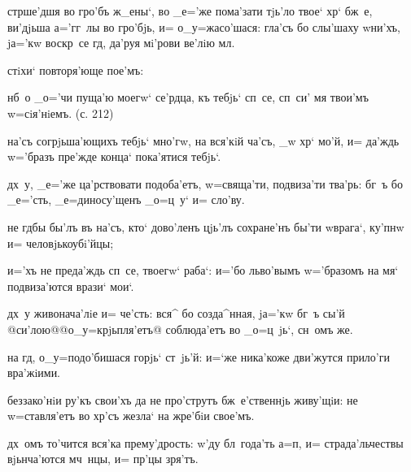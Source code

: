 
 стр ше'дшя во гро'бъ ж_ены`, во _е='же 
пома'зати тjь'ло твое` хр` бж~е, ви'дjьша а='гг~лы во 
гро'бjь, и= о_у=жасо'шася: гла'съ бо слы'шаху w\т ни'хъ, 
jа='кw воскр~се гд, да'руя мi'рови ве'лiю мл.


   стiхи` повторя'юще 
пое'мъ:

 нб~о _о='чи пуща'ю моегw` се'рдца, къ тебjь` 
сп~се, сп~си' мя твои'мъ w=сiя'нiемъ. (с. 212)

 на'съ согрjьша'ющихъ тебjь` мно'гw, на 
вся'кiй ча'съ, _w хр` мо'й, и= да'ждь w='бразъ 
пре'жде конца` пока'ятися тебjь`.

  дх~у, _е='же ца'рствовати 
подоба'етъ, w=свяща'ти, подвиза'ти тва'рь: бг~ъ бо 
_е='сть, _е=диносу'щенъ _о=ц~у` и= сло'ву.



 не гд бы бы'лъ въ на'съ, кто` дово'ленъ 
цjь'лъ сохране'нъ бы'ти w\т врага`, ку'пнw и= 
человjькоубi'йцы;

 и='хъ не преда'ждь сп~се, твоегw` раба`: 
и='бо льво'вымъ w='бразомъ на мя` подвиза'ются врази` 
мои`.

  дх~у живонача'лiе и= че'сть: вся^ 
бо созда^нная, jа='кw бг~ъ сы'й 
@си'лою@{@о_у=крjьпля'етъ@} соблюда'етъ во _о=ц~jь`, 
сн~омъ же.



 на гд, о_у=подо'бишася горjь` 
ст~jь'й: и=`же ника'коже дви'жутся прило'ги вра'жiими.

 беззако'нiи ру'къ свои'хъ да не про'струтъ 
бж~е'ственнjь живу'щiи: не w=ставля'етъ во хр'съ 
жезла` на жре'бiи свое'мъ.

  дх~омъ то'чится вся'ка 
прему'дрость: w'ду бл~года'ть а=п, и= 
страда'льчествы вjьнча'ются мч~нцы, и= пр'цы зря'тъ.


